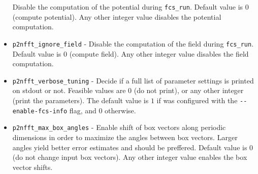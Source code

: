 \begin{itemize}
    Disable the computation of the potential during \verb!fcs_run!.
    Default value is $0$ (compute potential). Any other integer value disables the potential computation.
  \item \verb!p2nfft_ignore_field! -
    Disable the computation of the field during \verb!fcs_run!.
    Default value is $0$ (compute field). Any other integer value disables the field computation.
  \item \verb!p2nfft_verbose_tuning! -
    Decide if a full list of \ptwonfft parameter settings is printed on stdout or not.
    Feasible values are $0$ (do not print), or any other integer (print the parameters).
    The default value is $1$ if \project was configured with the \verb+--enable-fcs-info+ flag, and $0$ otherwise.
  \item \verb!p2nfft_max_box_angles! -
    Enable shift of box vectors along periodic dimensions in order to maximize the angles between box vectors.
    Larger angles yield better error estimates and should be preffered.
    Default value is $0$ (do not change input box vectors). Any other integer value enables the box vector shifts.
\end{itemize}

